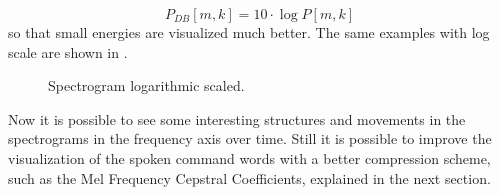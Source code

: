 \begin{equation}\label{eq:signal_spec_log}
  P_{DB}[m, k] = 10 \cdot \log{P[m, k]}
\end{equation}
so that small energies are visualized much better. 
The same examples with log scale are shown in .

\begin{figure}[!ht]
  \centering
  \caption{Spectrogram logarithmic scaled.}
  \label{fig:signal_spec_log_examples}
\end{figure}
\FloatBarrier
\noindent

Now it is possible to see some interesting structures and movements in the spectrograms in the frequency axis over time.
Still it is possible to improve the visualization of the spoken command words with a better compression scheme, such as the Mel Frequency Cepstral Coefficients, explained in the next section.